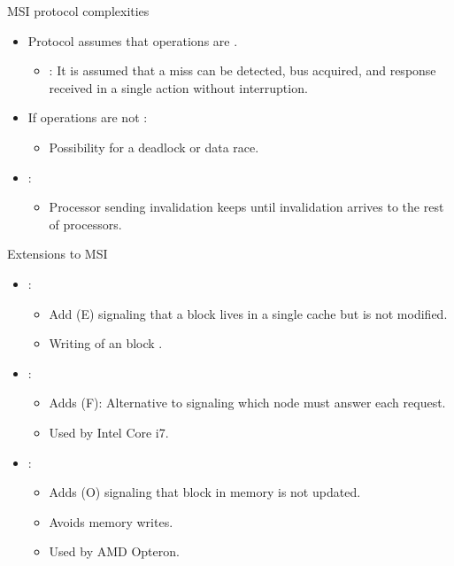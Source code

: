 \begin{frame}[t]{MSI protocol complexities}
\begin{itemize}
  \item Protocol assumes that operations are .
    \begin{itemize}
      \item {}: 
            It is assumed that a miss can be detected, 
            bus acquired, and 
            response received in a single action without interruption.
    \end{itemize}

  \item If operations are not :
    \begin{itemize}
      \item Possibility for a deadlock or data race.
    \end{itemize}

  \item {}:
    \begin{itemize}
      \item Processor sending invalidation keeps
            until invalidation arrives to the rest of processors.
    \end{itemize}
\end{itemize}
\end{frame}

\begin{frame}[t]{Extensions to MSI}
\begin{itemize}
  \pause
  \item {}:
    \begin{itemize}
       \item Add  (E) signaling
             that a block lives in a single cache but is not modified.
       \item Writing of an  block .
    \end{itemize}

  \item {}:
    \begin{itemize}
      \item Adds  (F): 
            Alternative to  signaling which node must answer each request.
      \item Used by Intel Core i7.
    \end{itemize}

  \item {}:
    \begin{itemize}
      \item Adds  (O) signaling
            that block in memory is not updated.
      \item Avoids memory writes.
      \item Used by AMD Opteron.
    \end{itemize}
\end{itemize}
\end{frame}
